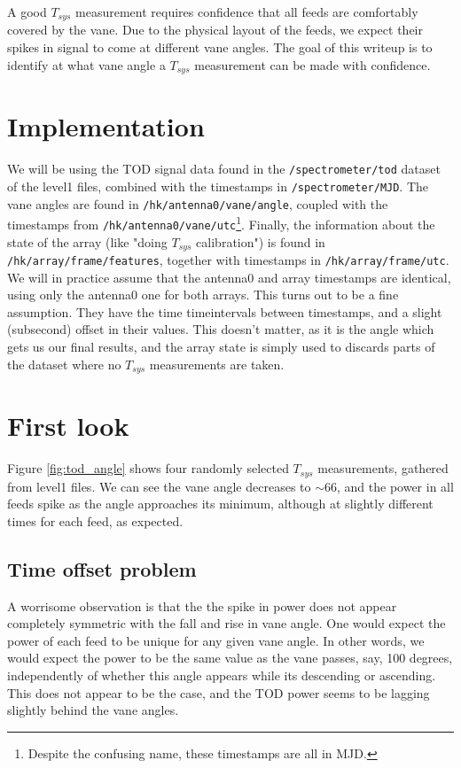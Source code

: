 \documentclass[10pt, a4paper]{article}
\begin{document}
A good $T_{sys}$ measurement requires confidence that all feeds are comfortably covered by the vane. Due to the physical layout of the feeds, we expect their spikes in signal to come at different vane angles. The goal of this writeup is to identify at what vane angle a $T_{sys}$ measurement can be made with confidence.


\section{Implementation}
We will be using the TOD signal data found in the \texttt{/spectrometer/tod} dataset of the level1 files, combined with the timestamps in \texttt{/spectrometer/MJD}. The vane angles are found in \texttt{/hk/antenna0/vane/angle}, coupled with the timestamps from \texttt{/hk/antenna0/vane/utc}\footnote{Despite the confusing name, these timestamps are all in MJD.}. Finally, the information about the state of the array (like "doing $T_{sys}$ calibration") is found in \texttt{/hk/array/frame/features}, together with timestamps in \texttt{/hk/array/frame/utc}. We will in practice assume that the antenna0 and array timestamps are identical, using only the antenna0 one for both arrays. This turns out to be a fine assumption. They have the time timeintervals between timestamps, and a slight (subsecond) offset in their values. This doesn't matter, as it is the angle which gets us our final results, and the array state is simply used to discards parts of the dataset where no $T_{sys}$ measurements are taken.


\section{First look}
Figure \ref{fig:tod_angle} shows four randomly selected $T_{sys}$ measurements, gathered from level1 files. We can see the vane angle decreases to $\sim 66$, and the power in all feeds spike as the angle approaches its minimum, although at slightly different times for each feed, as expected.

\subsection{Time offset problem}
A worrisome observation is that the the spike in power does not appear completely symmetric with the fall and rise in vane angle. One would expect the power of each feed to be unique for any given vane angle. In other words, we would expect the power to be the same value as the vane passes, say, 100 degrees, independently of whether this angle appears while its descending or ascending. This does not appear to be the case, and the TOD power seems to be lagging slightly behind the vane angles.
\end{document}
